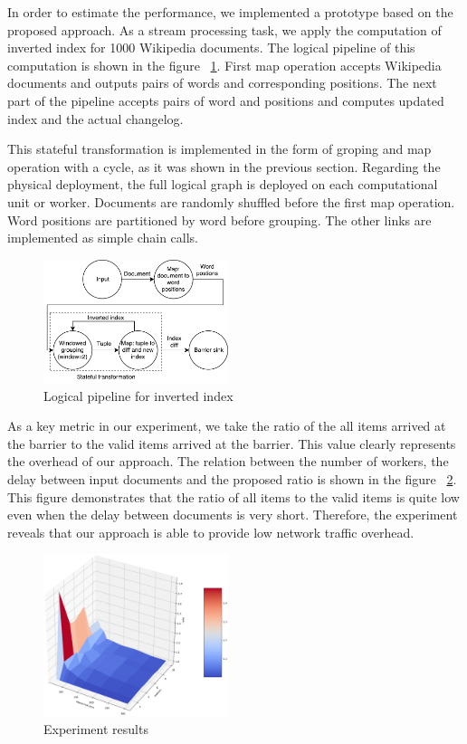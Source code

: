 
\label {fs-experiments}

In order to estimate the performance, we implemented a prototype based on  the proposed approach. As a stream processing task, we apply the computation of inverted index for 1000 Wikipedia documents. The logical pipeline of this computation is shown in the figure ~\ref{inverted-index}. First map operation accepts Wikipedia documents and outputs pairs of words and corresponding positions. The next part of the pipeline accepts pairs of word and positions and computes updated index and the actual changelog. 

This stateful transformation is implemented in the form of groping and map operation with a cycle, as it was shown in the previous section. Regarding the physical deployment, the full logical graph is deployed on each computational unit or worker. Documents are randomly shuffled before the first map operation. Word positions are partitioned by word before grouping. The other links are implemented as simple chain calls.

\begin{figure}[htbp]
  \centering
  \includegraphics[width=0.48\textwidth]{pics/inverted-index}
  \caption{Logical pipeline for inverted index}
  \label {inverted-index}
\end{figure}

As a key metric in our experiment, we take the ratio of the all items arrived at the barrier to the valid items arrived at the barrier. This value clearly represents the overhead of our approach. The relation between the number of workers, the delay between input documents and the proposed ratio is shown in the figure ~\ref{experiment}. This figure demonstrates that the ratio of all items to the valid items is quite low even when the delay between documents is very short. Therefore, the experiment reveals that our approach is able to provide low network traffic overhead. 

\begin{figure}[htbp]
  \centering
  \includegraphics[width=0.48\textwidth]{pics/experiment}
  \caption{Experiment results}
  \label {experiment}
\end{figure}
